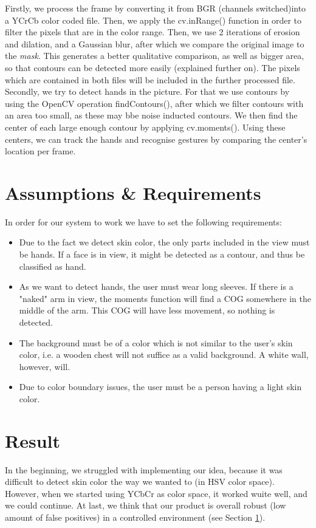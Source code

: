 \documentclass[11pt,a4paper]{article}
\begin{document}
Firstly, we process the frame by converting it from BGR (channels switched)into a YCrCb color coded file. Then, we apply the cv.inRange() function in order to filter the pixels that are in the color range. Then, we use 2 iterations of erosion and dilation, and a Gaussian blur, after which we compare the original image to the \emph{mask}. This generates a better qualitative comparison, as well as bigger area, so that contours can be detected more easily (explained further on). The pixels which are contained in both files will be included in the further processed file.\\
\indent Secondly, we try to detect hands in the picture. For that we use contours by using the OpenCV operation findContours(), after which we filter contours with an area too small, as these may bbe noise inducted contours. We then find the center of each large enough contour by applying cv.moments(). Using these centers, we can track the hands and recognise gestures by comparing the center's location per frame.
\section{Assumptions \& Requirements}
\label{Ass}
In order for our system to work we have to set the following requirements:

\begin{itemize}
\item Due to the fact we detect skin color, the only parts included in the view must be hands. If a face is in view, it might be detected as a contour, and thus be classified as hand.
\item As we want to detect hands, the user must wear long sleeves. If there is a "naked" arm in view, the moments function will find a COG somewhere in the middle of the arm. This COG will have less movement, so nothing is detected.
\item The background must be of a color which is not similar to the user's skin color, i.e. a wooden chest will not suffice as a valid background. A white wall, however, will.
\item Due to color boundary issues, the user must be a person having a light skin color.

\end{itemize}

\section{Result}
In the beginning, we struggled with implementing our idea, because it was difficult to detect skin color the way we wanted to (in HSV color space). However, when we started using YCbCr as color space, it worked wuite well, and we could continue. At last, we think that our product is overall robust (low amount of false positives) in a controlled environment (see Section \ref{Ass}). 
\end{document}
